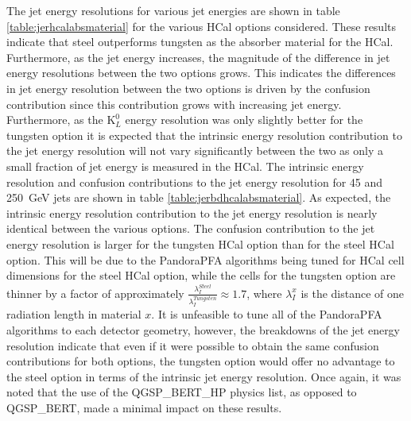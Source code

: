 The jet energy resolutions for various jet energies are shown in table \ref{table:jerhcalabsmaterial} for the various HCal options considered.  These results indicate that steel outperforms tungsten as the absorber material for the HCal.  Furthermore, as the jet energy increases, the magnitude of the difference in jet energy resolutions between the two options grows.  This indicates the differences in jet energy resolution between the two options is driven by the confusion contribution since this contribution grows with increasing jet energy.  Furthermore, as the $\text{K}^{0}_{L}$ energy resolution was only slightly better for the tungsten option it is expected that the intrinsic energy resolution contribution to the jet energy resolution will not vary significantly between the two as only a small fraction of jet energy is measured in the HCal.  The intrinsic energy resolution and confusion contributions to the jet energy resolution for 45 and 250~GeV jets are shown in table \ref{table:jerbdhcalabsmaterial}.  As expected, the intrinsic energy resolution contribution to the jet energy resolution is nearly identical between the various options.  The confusion contribution to the jet energy resolution is larger for the tungsten HCal option than for the steel HCal option.  This will be due to the PandoraPFA algorithms being tuned for HCal cell dimensions for the steel HCal option, while the cells for the tungsten option are thinner by a factor of approximately $\frac{\lambda_{I}^{Steel}}{\lambda_{I}^{Tungsten}} \approx 1.7$, where $\lambda_{I}^{x}$ is the distance of one radiation length in material $x$.  It is unfeasible to tune all of the PandoraPFA algorithms to each detector geometry, however, the breakdowns of the jet energy resolution indicate that even if it were possible to obtain the same confusion contributions for both options, the tungsten option would offer no advantage to the steel option in terms of the intrinsic jet energy resolution.  Once again, it was noted that the use of the QGSP\_BERT\_HP physics list, as opposed to QGSP\_BERT, made a minimal impact on these results.

